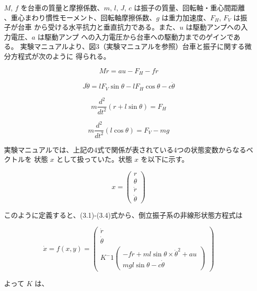 \documentclass[10pt,a4paper,titlepage]{jreport} %
\begin{document}
$M$, $f$ を台車の質量と摩擦係数、$m$, $l$, $J$, $c$ は振子の質量、回転軸・重心間距離
、重心まわり慣性モーメント、回転軸摩擦係数、$g$ は重力加速度、$F_H$, $F_V$ は振子が台車
から受ける水平抗力と垂直抗力である。また、$u$ は駆動アンプへの入力電圧、$a$ は駆動アンプ
への入力電圧から台車への駆動力までのゲインである。
実験マニュアルより、図3（実験マニュアルを参照）台車と振子に関する微分方程式が次のように
得られる。

\begin{equation}
M\ddot{r} = au - F_H - f\dot{r}
\end{equation}

\begin{equation}
J\ddot{\theta} = lF_V\sin\theta - lF_H\cos\theta - c\dot{\theta}
\end{equation}

\begin{equation}
m\frac{d^2}{dt^2}(r + l\sin\theta) = F_H
\end{equation}

\begin{equation}
m\frac{d^2}{dt^2}(l\cos\theta) = F_V - mg
\end{equation}

実験マニュアルでは、上記の4式で関係が表されている4つの状態変数からなるベクトルを
状態 $x$ として扱っていた。状態 $x$ を以下に示す。

\begin{equation}
x = 
\begin{pmatrix}
r \\ \theta \\ \dot{r} \\ \dot{\theta}
\end{pmatrix}
\end{equation}

このように定義すると、(3.1)-(3.4)式から、倒立振子系の非線形状態方程式は

\begin{equation}
\dot{x} = f(x,y) = 
\begin{pmatrix}
\dot{r} \\ \dot{\theta} \\ K^-1
\begin{pmatrix}
-f\dot{r} + ml\sin\theta\times\dot{\theta}^2 + au \\ mgl\sin\theta - c\dot{\theta}
\end{pmatrix}
\end{pmatrix}
\end{equation}

よって $K$ は、
\end{document}
